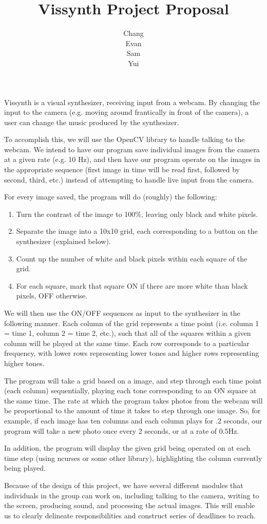 \documentclass{article}
\title{Vissynth Project Proposal}
\author{Chang \\ Evan \\ Sam \\ Yui}
\begin{document}
\maketitle

Vissynth is a visual synthesizer, receiving input from a webcam.
By changing the input to the camera (e.g. moving around
frantically in front of the camera), a user can change the music
produced by the synthesizer.

To accomplish this, we will use the OpenCV library to handle
talking to the webcam. We intend to have our program save
individual images from the camera at a given rate (e.g. 10 Hz),
and then have our program operate on the images in the appropriate
sequence (first image in time will be read first, followed by
second, third, etc.) instead of attempting to handle live input
from the camera.

For every image saved, the program will do (roughly) the
following:

\begin{enumerate}
  \item Turn the contrast of the image to 100\%, leaving only black and white pixels.
  \item Separate the image into a 10x10 grid, each corresponding to a button on the synthesizer (explained below).
  \item Count up the number of white and black pixels within each square of the grid.
  \item For each square, mark that square ON if there are more white than black pixels, OFF otherwise.
\end{enumerate}

We will then use the ON/OFF sequences as input to the synthesizer
in the following manner. Each column of the grid represents a time
point (i.e. column 1 = time 1, column 2 = time 2, etc.), such that
all of the squares within a given column will be played at the
same time. Each row corresponds to a particular frequency, with
lower rows representing lower tones and higher rows representing
higher tones.

The program will take a grid based on a image, and step through
each time point (each column) sequentially, playing each tone
corresponding to an ON square at the same time. The rate at which
the program takes photos from the webcam will be proportional to
the amount of time it takes to step through one image. So, for
example, if each image has ten columns and each column plays for
.2 seconds, our program will take a new photo once every 2
seconds, or at a rate of 0.5Hz.

In addition, the program will display the given grid being
operated on at each time step (using ncurses or some other
library), highlighting the column currently being played.

Because of the design of this project, we have several different
modules that individuals in the group can work on, including
talking to the camera, writing to the screen, producing sound, and
processing the actual images. This will enable us to clearly
delineate responsibilities and construct series of deadlines to
reach.
\end{document}
